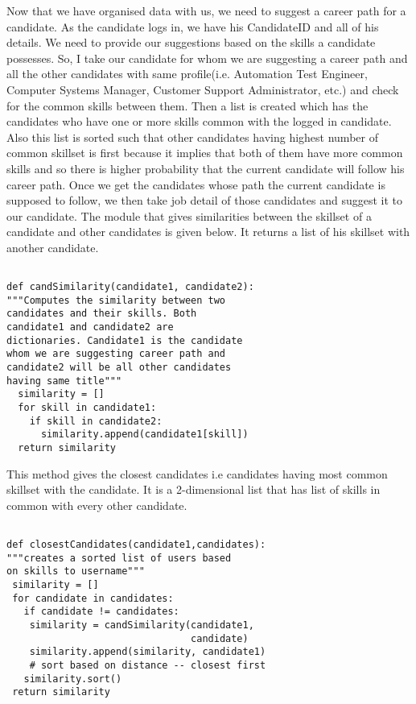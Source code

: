 \documentclass[conference]{IEEEtran}
\begin{document}
Now that we have organised data with us, we need to suggest a career path for a candidate. As the candidate logs in, we have his CandidateID and all of his details. We need to provide our suggestions based on the skills a candidate possesses. So, I take our candidate for whom we are suggesting a career path and all the other candidates with same profile(i.e. Automation Test Engineer, Computer Systems Manager, Customer Support Administrator, etc.) and check for the common skills between them. Then a list is created which has the candidates who have one or more skills common with the logged in candidate. Also this list is sorted such that other candidates having highest number of common skillset is first because it implies that both of them have more common  skills and so there is higher probability that the current candidate will follow his career path. Once we get the candidates whose path the current candidate is supposed to follow, we then take job detail of those candidates and suggest it to our candidate.
The module that gives similarities between the skillset of a candidate and other candidates is given below. It returns a list of his skillset with another candidate.

\begin{lstlisting}
	
def candSimilarity(candidate1, candidate2):
"""Computes the similarity between two 
candidates and their skills. Both 
candidate1 and candidate2 are
dictionaries. Candidate1 is the candidate 
whom we are suggesting career path and 
candidate2 will be all other candidates
having same title"""
  similarity = []
  for skill in candidate1:
    if skill in candidate2:
	  similarity.append(candidate1[skill]) 
  return similarity

\end{lstlisting}

This method gives the closest candidates i.e candidates having most common skillset with the candidate. It is a 2-dimensional list that has list of skills in common with every other candidate. 

\begin{lstlisting}

def closestCandidates(candidate1,candidates):
"""creates a sorted list of users based 
on skills to username"""
 similarity = []
 for candidate in candidates:
   if candidate != candidates:
    similarity = candSimilarity(candidate1,
                                candidate)
    similarity.append(similarity, candidate1)
    # sort based on distance -- closest first
   similarity.sort()
 return similarity
    
\end{lstlisting}
\end{document}
